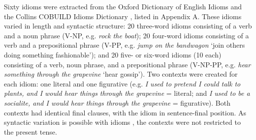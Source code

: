 \documentclass[output=paper
,modfonts
,nonflat]{langsci/langscibook}
\begin{document}
Sixty idioms were extracted from the Oxford Dictionary of English Idioms \citep{OxfordIdiomsDictionary} and the Collins COBUILD Idioms Dictionary \citep{CollinsIdiomsDictionary}, listed in Appendix A. These idioms varied in length and syntactic structure: 20 three-word idioms consisting of a verb and a noun phrase (V-NP, e.g. \textit{rock the boat}); 20 four-word idioms consisting of a verb and a prepositional phrase (V-PP, e.g. \textit{jump on the bandwagon} `join others doing something fashionable'); and 20 five- or six-word idioms (10 each) consisting of a verb, noun phrase, and a prepositional phrase (V-NP-PP, e.g. \textit{hear something through the grapevine} `hear gossip'). Two contexts were created for each idiom: one literal and one figurative (e.g. \textit {I used to pretend I could talk to plants, and I would hear things through the grapevine} = literal; and \textit {I used to be a socialite, and I would hear things through the grapevine} = figurative). Both contexts had identical final clauses, with the idiom in sentence-final position. As syntactic variation is possible with idioms \citep{Moon1998, Schroder2013}, the contexts were not restricted to the present tense.
\end{document}
